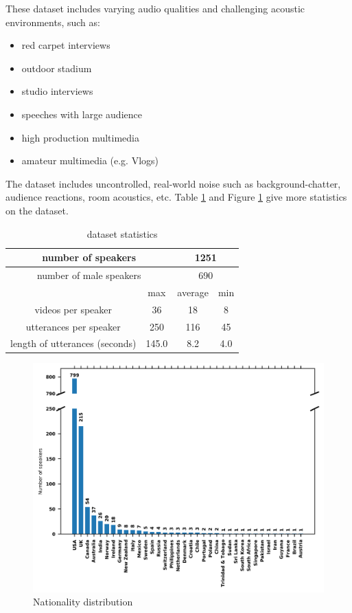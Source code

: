 \documentclass{article}
\begin{document}
These dataset includes varying audio qualities and challenging acoustic environments, such as:
\begin{itemize}
    \item red carpet interviews
    \item outdoor stadium
    \item studio interviews
    \item speeches with large audience
    \item high production multimedia
    \item amateur multimedia (e.g. Vlogs)
\end{itemize}

The dataset includes uncontrolled, real-world noise such as  background-chatter, audience reactions, room acoustics, etc. Table \ref{tab:stats_1} and Figure \ref{fig:stats_2} give more statistics on the dataset.


\begin{table}[H]
    \centering
    \begin{tabular}{ |c||c|c|c|  }
    \hline
    \multicolumn{2}{|c|}{number of speakers} & \multicolumn{2}{|c|}{1251} \\
    \hline
    \multicolumn{2}{|c|}{number of male speakers} & \multicolumn{2}{|c|}{690} \\
    \hline
     & max & average & min \\
     \hline
    videos per speaker & 36 & 18 & 8 \\
    \hline
    utterances per speaker & 250 & 116 & 45 \\
    \hline
    length of utterances (seconds) & 145.0 & 8.2 & 4.0 \\
    \hline
    \end{tabular}
    \caption{dataset statistics}
    \label{tab:stats_1}
\end{table}
\begin{figure}[H]
    \centering
    \includegraphics[scale=.75]{images/country.png}
    \caption{Nationality distribution}
    \label{fig:stats_2}
\end{figure}
\end{document}
